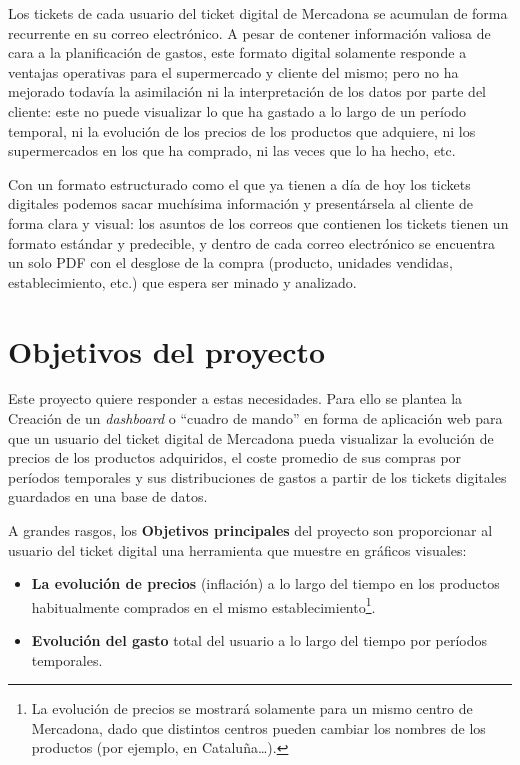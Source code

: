 \documentclass[a4paper,12pt]{report}
\begin{document}
		Los tickets de cada usuario del ticket digital de Mercadona se acumulan de forma recurrente en su correo electrónico. A pesar de contener información valiosa de cara a la planificación de gastos, este formato digital solamente responde a ventajas operativas para el supermercado y cliente del mismo; pero no ha mejorado todavía la asimilación ni la interpretación de los datos por parte del cliente: este no puede visualizar lo que ha gastado a lo largo de un período temporal, ni la evolución de los precios de los productos que adquiere, ni los supermercados en los que ha comprado, ni las veces que lo ha hecho, etc.
		
		Con un formato estructurado como el que ya tienen a día de hoy los tickets digitales podemos sacar muchísima información y presentársela al cliente de forma clara y visual: los asuntos de los correos que contienen los tickets tienen un formato estándar y predecible, y dentro de cada correo electrónico se encuentra un solo PDF con el desglose de la compra (producto, unidades vendidas, establecimiento, etc.) que espera ser minado y analizado.
 
		\section{Objetivos del proyecto} %
		\label{section:objetivosProyecto}
		
		Este proyecto quiere responder a estas necesidades. Para ello se plantea la Creación de un \textit{dashboard} o ``cuadro de mando'' en forma de aplicación web para que un usuario del ticket digital de Mercadona pueda visualizar la evolución de precios de los productos adquiridos, el coste promedio de sus compras por períodos temporales y sus distribuciones de gastos a partir de los tickets digitales guardados en una base de datos.
		
		A grandes rasgos, los \textbf{Objetivos principales} del proyecto son proporcionar al usuario del ticket digital una herramienta que muestre en gráficos visuales:

					
		\begin{itemize}
			\setlength{\itemsep}{-.5em}
			\item \textbf{La evolución de precios} (inflación) a lo largo del tiempo en los productos habitualmente comprados en el mismo establecimiento\footnote{La evolución de precios se mostrará solamente para un mismo centro de Mercadona, dado que distintos centros pueden cambiar los nombres de los productos (por ejemplo, en Cataluña…).}.
			\item \textbf{Evolución del gasto} total del usuario a lo largo del tiempo por períodos temporales.
		\end{itemize}
		
\end{document}

